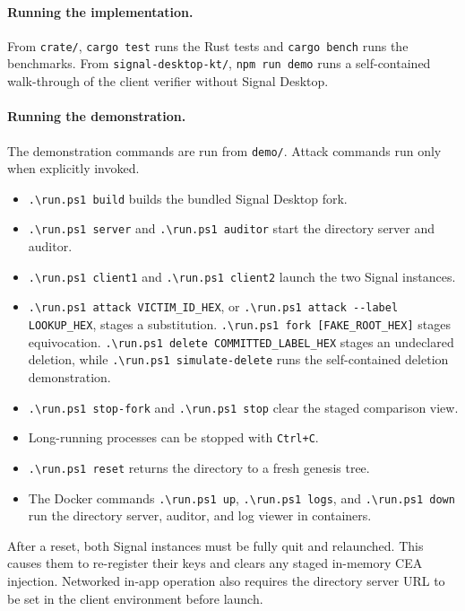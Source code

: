 \paragraph{Running the implementation.}
From \texttt{crate/}, \texttt{cargo test} runs the Rust tests and \texttt{cargo bench} runs the
benchmarks. From \texttt{signal-desktop-kt/}, \texttt{npm run demo} runs a self-contained
walk-through of the client verifier without Signal Desktop.

\paragraph{Running the demonstration.}
The demonstration commands are run from \texttt{demo/}. Attack commands run only when explicitly
invoked.
\begin{itemize}
  \item \texttt{.\textbackslash run.ps1 build} builds the bundled Signal Desktop fork.
  \item \texttt{.\textbackslash run.ps1 server} and
  \texttt{.\textbackslash run.ps1 auditor} start the directory server and auditor.
  \item \texttt{.\textbackslash run.ps1 client1} and
  \texttt{.\textbackslash run.ps1 client2} launch the two Signal instances.
  \item \texttt{.\textbackslash run.ps1 attack VICTIM\_ID\_HEX}, or
  \texttt{.\textbackslash run.ps1 attack -{}-label LOOKUP\_HEX}, stages a substitution.
  \texttt{.\textbackslash run.ps1 fork [FAKE\_ROOT\_HEX]} stages equivocation.
  \texttt{.\textbackslash run.ps1 delete COMMITTED\_LABEL\_HEX} stages an undeclared deletion, while
  \texttt{.\textbackslash run.ps1 simulate-delete} runs the self-contained deletion demonstration.
  \item \texttt{.\textbackslash run.ps1 stop-fork} and
  \texttt{.\textbackslash run.ps1 stop} clear the staged comparison view.
  \item Long-running processes can be stopped with \texttt{Ctrl+C}.
  \item \texttt{.\textbackslash run.ps1 reset} returns the directory to a fresh genesis tree.
  \item The Docker commands \texttt{.\textbackslash run.ps1 up},
  \texttt{.\textbackslash run.ps1 logs}, and \texttt{.\textbackslash run.ps1 down} run the
  directory server, auditor, and log viewer in containers.
\end{itemize}

After a reset, both Signal instances must be fully quit and relaunched. This causes them to
re-register their keys and clears any staged in-memory CEA injection. Networked in-app operation
also requires the directory server URL to be set in the client environment before launch.

